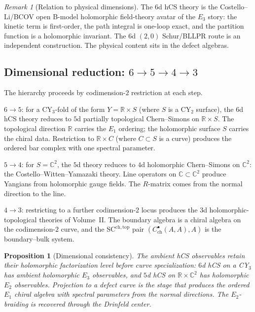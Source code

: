 \documentclass[11pt]{article}
\theoremstyle{plain}
\newtheorem{proposition}[theorem]{Proposition}
\theoremstyle{definition}
\theoremstyle{remark}
\newtheorem{remark}[theorem]{Remark}
\newcommand{\bC}{\mathbb{C}}
\newcommand{\bR}{\mathbb{R}}
\newcommand{\Eone}{E_1}
\newcommand{\Etwo}{E_2}
\newcommand{\SCchtop}{\mathrm{SC}^{\mathrm{ch},\mathrm{top}}}
\begin{document}
\begin{remark}[Relation to physical dimensions]
\label{rem:v3-qg-hcs-physical}
The $6$d hCS theory is the Costello--Li/BCOV open B-model
holomorphic field-theory avatar of the $E_3$ story: the kinetic term
is first-order, the path integral is one-loop exact, and the partition
function is a holomorphic invariant.  The $6$d $(2,0)$ Schur/BLLPR
route is an independent construction.  The physical content sits in
the defect algebras.
\end{remark}

\subsection{Dimensional reduction: $6 \to 5 \to 4 \to 3$}

The hierarchy proceeds by codimension-$2$ restriction at each step.

\emph{$6 \to 5$}: for a CY$_3$-fold of the form
$Y = \bR \times S$ (where $S$ is a CY$_2$ surface), the $6$d hCS
theory reduces to $5$d partially topological Chern--Simons on
$\bR \times S$.  The topological direction $\bR$ carries the
$\Eone$ ordering; the holomorphic surface $S$ carries the chiral
data.  Restriction to $\bR \times C$ (where $C \subset S$ is a
curve) produces the ordered bar complex with one spectral parameter.

\emph{$5 \to 4$}: for $S = \bC^2$, the $5$d theory reduces to
$4$d holomorphic Chern--Simons on $\bC^2$: the
Costello--Witten--Yamazaki theory.  Line operators on $\bC \subset
\bC^2$ produce Yangians from holomorphic gauge fields.  The
$R$-matrix comes from the normal direction to the line.

\emph{$4 \to 3$}: restricting to a further codimension-$2$ locus
produces the $3$d holomorphic-topological theories of Volume~II.
The boundary algebra is a chiral algebra on the codimension-$2$
curve, and the $\SCchtop$ pair
$(C^\bullet_{\mathrm{ch}}(A,A), A)$ is the boundary--bulk system.

\begin{proposition}[Dimensional consistency]
\label{prop:v3-qg-dim-consistency}
The ambient hCS observables retain their holomorphic factorization
level before curve specialization: $6$d hCS on a CY$_3$ has ambient
holomorphic $E_3$ observables, and $5$d hCS on $\bR\times\bC^2$
has holomorphic $E_2$ observables. Projection to a defect curve is
the stage that produces the ordered $\Eone$ chiral algebra with
spectral parameters from the normal directions. The $\Etwo$-braiding
is recovered through the Drinfeld center.
\end{proposition}
\end{document}
